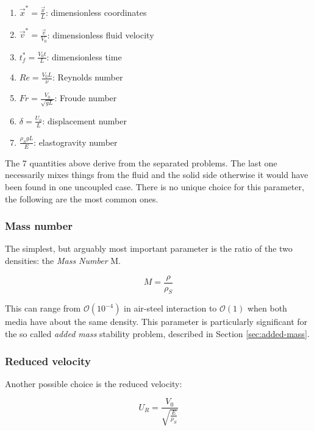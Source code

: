 \begin{enumerate}
	\item $\vec{x}^* = \frac{\vec{x}}{L}$: dimensionless coordinates
	\item $\vec{v}^* = \frac{\vec{v}}{V_0}$: dimensionless fluid velocity
	\item $t^*_f = \frac{V_0 t}{L}$: dimensionless time
	\item $Re = \frac{V_0 L}{\nu}$: Reynolds number
	\item $Fr = \frac{V_0}{\sqrt{gL}}$: Froude number
	\item $\delta = \frac{U_0}{L}$: displacement number
	\item $\frac{\rho_S g L}{E}$: elastogravity number
\end{enumerate}

The 7 quantities above derive from the separated problems. The last one necessarily mixes things from the fluid and the solid side otherwise it would have been found in one uncoupled case. There is no unique choice for this parameter, the following are the most common ones.

\subsubsection{Mass number}
\label{subsec:mass-ratio}

The simplest, but arguably most important parameter is the ratio of the two densities: the \textit{Mass Number} M.

\begin{equation}
	M = \frac{\rho}{\rho_S}
	\label{eq:mass-number}
\end{equation}

This can range from $\mathcal{O}\left(10^{-4}\right)$ in air-steel interaction to $\mathcal{O}\left(1\right)$ when both media have about the same density. This parameter is particularly significant for the so called \textit{added mass} stability problem, described in Section \ref{sec:added-mass}.

\subsubsection{Reduced velocity}

Another possible choice is the reduced velocity:

\begin{equation}
	 U_R = \frac{V_0}{\sqrt{\frac{E}{\rho_S}}}
\end{equation}

